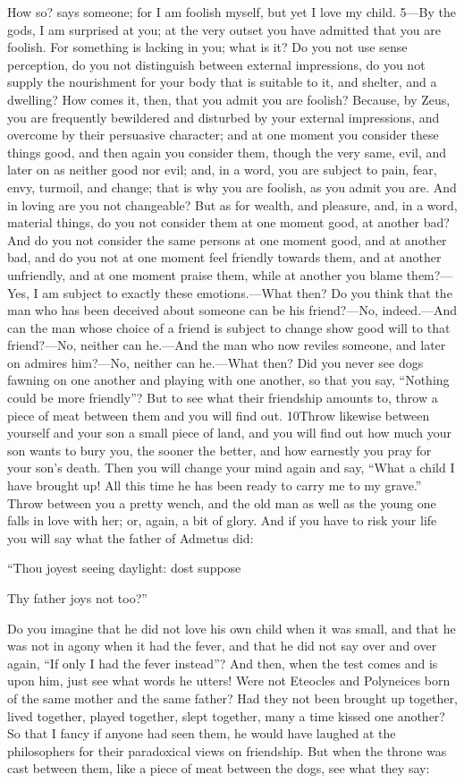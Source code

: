 How so? says someone; for I am foolish myself, but yet I love my child. 5—By the gods, I am surprised at you; at the very outset you have admitted that you are foolish. For something is lacking in you; what is it? Do you not use sense perception, do you not distinguish between external impressions, do you not supply the nourishment for your body that is suitable to it, and shelter, and a dwelling? How comes it, then, that you admit you are foolish? Because, by Zeus, you are frequently bewildered and disturbed by your external impressions, and overcome by their persuasive character; and at one moment you consider these things good, and then again you consider them, though the very same, evil, and later on as neither good nor evil; and, in a word, you are subject to pain, fear, envy, turmoil, and change; that is why you are foolish, as you admit you are. And in loving are you not changeable? But as for wealth, and pleasure, and, in a word, material things, do you not consider them at one moment good, at another bad? And do you not consider the same persons at one moment good, and at another bad, and do you not at one moment feel friendly towards them, and at another unfriendly, and at one moment praise them, while at another you blame them?—Yes, I am subject to exactly these emotions.—What then? Do you think that the man who has been deceived about someone can be his friend?—No, indeed.—And can the man whose choice of a friend is subject to change show good will to that friend?—No, neither can he.—And the man who now reviles someone, and later on admires him?—No, neither can he.—What then? Did you never see dogs fawning on one another and playing with one another, so that you say, ``Nothing could be more friendly''? But to see what their friendship amounts to, throw a piece of meat between them and you will find out. 10Throw likewise between yourself and your son a small piece of land, and you will find out how much your son wants to bury you, the sooner the better, and how earnestly you pray for your son's death. Then you will change your mind again and say, ``What a child I have brought up! All this time he has been ready to carry me to my grave.'' Throw between you a pretty wench, and the old man as well as the young one falls in love with her; or, again, a bit of glory. And if you have to risk your life you will say what the father of Admetus did:

``Thou joyest seeing daylight: dost suppose

Thy father joys not too?''

Do you imagine that he did not love his own child when it was small, and that he was not in agony when it had the fever, and that he did not say over and over again, ``If only I had the fever instead''? And then, when the test comes and is upon him, just see what words he utters! Were not Eteocles and Polyneices born of the same mother and the same father? Had they not been brought up together, lived together, played together, slept together, many a time kissed one another? So that I fancy if anyone had seen them, he would have laughed at the philosophers for their paradoxical views on friendship. But when the throne was cast between them, like a piece of meat between the dogs, see what they say:

